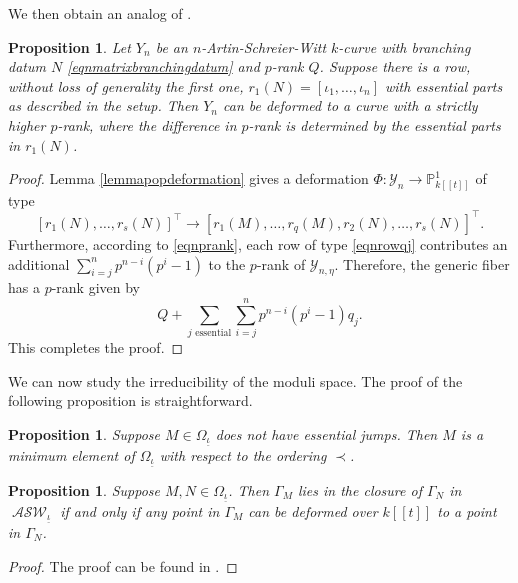 \documentclass{compositio}
\newtheorem{proposition}[theorem]{Proposition}
\theoremstyle{remark}
\theoremstyle{remark}
\DeclareMathOperator{\ASW}{\mathcal{ASW}}
\begin{document}
We then obtain an analog of \cite[Proposition 4.2]{MR2985514}.

\begin{proposition}
Let $Y_n$ be an $n$-Artin-Schreier-Witt $k$-curve with branching datum $N$ \eqref{eqnmatrixbranchingdatum} and $p$-rank $Q$. Suppose there is a row, without loss of generality the first one, $r_1(N) = [\iota_1, \ldots, \iota_n]$ with essential parts as described in the setup. Then $Y_n$ can be deformed to a curve with a strictly higher $p$-rank, where the difference in $p$-rank is determined by the essential parts in $r_1(N)$.
\end{proposition}

\begin{proof}
    Lemma \ref{lemmapopdeformation} gives a deformation $\Phi: \mathscr{Y}_n \xrightarrow{} \mathbb{P}^1_{k[[t]]}$ of type $$[r_1(N), \ldots, r_s(N)]^{\top} \rightarrow [r_{1}(M), \ldots, r_{q}(M), r_2(N), \ldots, r_s(N)]^{\top}.$$ 
    Furthermore, according to \eqref{eqnprank}, each row of type \eqref{eqnrowqj} contributes an additional $\sum_{i=j}^n p^{n-i} (p^i-1)$ to the $p$-rank of $\mathscr{Y}_{n, \eta}$. Therefore, the generic fiber has a $p$-rank given by
    \begin{equation*}
        Q + \sum_{j \text{ essential}} \sum_{i=j}^n p^{n-i} (p^i-1) q_j.
    \end{equation*}
    This completes the proof.
\end{proof}

We can now study the irreducibility of the moduli space. The proof of the following proposition is straightforward.

\begin{proposition}
\label{propminimumbranchingdatum}
Suppose $M \in \Omega_{\underline{\iota}}$ does not have essential jumps. Then $M$ is a minimum element of $\Omega_{\underline{\iota}}$ with respect to the ordering $\prec$.
\end{proposition}

\begin{proposition}
\label{propclosuredeformation}
Suppose $M, N \in \Omega_{\underline{\iota}}$. Then $\Gamma_{M}$ lies in the closure of $\Gamma_{N}$ in $\ASW_{\underline{\iota}}$ if and only if any point in $\Gamma_{M}$ can be deformed over $k[[t]]$ to a point in $\Gamma_{N}$.
\end{proposition}

\begin{proof}
The proof can be found in \cite[Proposition 3.4]{DANG2020398}.
\end{proof}
\end{document}
